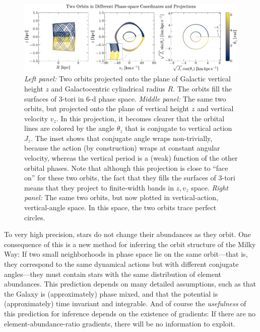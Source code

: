 \documentclass[modern]{aastex63}
\begin{document}
\begin{figure}[!tp]
  \begin{mdframed}[style=figure]
  \begin{center}
  \includegraphics[width=\textwidth]{zvz-orbit-demo.pdf}
  \end{center}
  \caption{%
    \textsl{Left panel:} Two orbits projected onto the plane of
    Galactic vertical height $z$ and Galactocentric cylindrical radius
    $R$. The orbits fill the surfaces of 3-tori in 6-d phase space.
    \textsl{Middle panel:} The same two orbits, but projected onto the plane
    of vertical height $z$ and vertical velocity $v_z$. In this projection,
    it becomes clearer that the orbital lines are
    colored by the angle $\theta_z$ that is conjugate to vertical action $J_z$.
    The inset shows that conjugate angle wraps non-trivially, because the action
    (by construction) wraps at constant angular velocity, whereas the vertical period
    is a (weak) function of the other orbital phases.
    Note that although this projection is close to ``face on'' for these two
    orbits, the fact that they fills the surfaces of 3-tori means that they
    project to finite-width bands in $z, v_z$ space.
    \textsl{Right panel:} The same two orbits, but now plotted in vertical-action,
    vertical-angle space. In this space, the two orbits trace perfect circles.
  \label{fig:zvz-demo}
  }
  \end{mdframed}
\end{figure}

To very high precision, stars do not change their abundances as they orbit.
One consequence of this is a new method for inferring the orbit structure of the
Milky Way:
If two small neighborhoods in phase space lie on the same orbit---that is, they
correspond to the same dynamical actions but with different conjugate
angles---they must contain stars with the same distribution of element
abundances.
This prediction depends on many detailed assumptions, such as that the Galaxy is
(approximately) phase mixed, and that the potential is (approximately) time
invariant and integrable.
And of course the \emph{usefulness} of this prediction for inference depends on
the existence of gradients: If there are no element-abundance-ratio gradients,
there will be no information to exploit.
\end{document}
